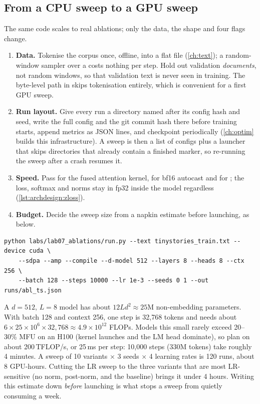 \subsection{From a CPU sweep to a GPU sweep}

The same code scales to real ablations; only the data, the shape and four flags change.

\begin{enumerate}
\item \textbf{Data.} Tokenise the corpus once, offline, into a flat  file
  (\cref{ch:text}); a random-window sampler over a  costs nothing per step. Hold out
  validation \emph{documents}, not random windows, so that validation text is never seen in training. The
  byte-level path in  skips tokenisation entirely, which is convenient for a first
  GPU sweep.
\item \textbf{Run layout.} Give every run a directory named after its config hash and seed, write the full
  config and the git commit hash there before training starts, append metrics as JSON lines, and checkpoint
  periodically (\cref{ch:optim} builds this infrastructure). A sweep is then a list of configs plus a launcher
  that skips directories that already contain a finished marker, so re-running the sweep after a crash
  resumes it.
\item \textbf{Speed.} Pass  for the fused attention kernel,  for bf16 autocast and
   for ; the loss, softmax and norms stay in fp32 inside the model
  regardless (\cref{lst:archdesign:zloss}).
\item \textbf{Budget.} Decide the sweep size from a napkin estimate before launching, as below.
\end{enumerate}

\begin{lstlisting}[style=shell]
python labs/lab07_ablations/run.py --text tinystories_train.txt --device cuda \
    --sdpa --amp --compile --d-model 512 --layers 8 --heads 8 --ctx 256 \
    --batch 128 --steps 10000 --lr 1e-3 --seeds 0 1 --out runs/abl_ts.json
\end{lstlisting}

\begin{napkinmath}
A $d=512$, $L=8$ model has about $12Ld^2\approx25$M non-embedding parameters. With batch 128 and context 256,
one step is 32{,}768 tokens and needs about $6\times25\times10^6\times32{,}768\approx4.9\times10^{12}$ FLOPs.
Models this small rarely exceed 20--30\% MFU on an H100 (kernel launches and the LM head dominate), so plan
on about 200\,TFLOP/s, or 25\,ms per step: 10{,}000 steps (330M tokens) take roughly 4 minutes. A sweep of 10
variants $\times$ 3 seeds $\times$ 4 learning rates is 120 runs, about 8 GPU-hours. Cutting the LR sweep to the
three variants that are most LR-sensitive (no norm, post-norm, and the baseline) brings it under 4 hours.
Writing this estimate down \emph{before} launching is what stops a sweep from quietly consuming a week.
\end{napkinmath}

